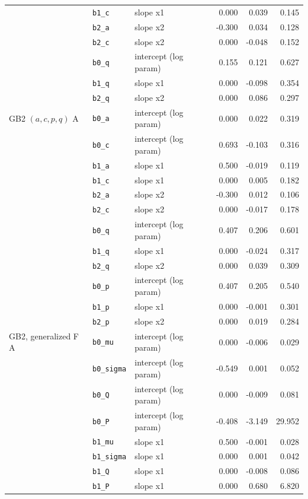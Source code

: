 {\begin{longtable}{lllrrr}
 & \texttt{b1\_c} & slope x1 & 0.000 & 0.039 & 0.145 \\
 & \texttt{b2\_a} & slope x2 & -0.300 & 0.034 & 0.128 \\
 & \texttt{b2\_c} & slope x2 & 0.000 & -0.048 & 0.152 \\
 & \texttt{b0\_q} & intercept (log param) & 0.155 & 0.121 & 0.627 \\
 & \texttt{b1\_q} & slope x1 & 0.000 & -0.098 & 0.354 \\
 & \texttt{b2\_q} & slope x2 & 0.000 & 0.086 & 0.297 \\
GB2 $(a,c,p,q)$ A & \texttt{b0\_a} & intercept (log param) & 0.000 & 0.022 & 0.319 \\
 & \texttt{b0\_c} & intercept (log param) & 0.693 & -0.103 & 0.316 \\
 & \texttt{b1\_a} & slope x1 & 0.500 & -0.019 & 0.119 \\
 & \texttt{b1\_c} & slope x1 & 0.000 & 0.005 & 0.182 \\
 & \texttt{b2\_a} & slope x2 & -0.300 & 0.012 & 0.106 \\
 & \texttt{b2\_c} & slope x2 & 0.000 & -0.017 & 0.178 \\
 & \texttt{b0\_q} & intercept (log param) & 0.407 & 0.206 & 0.601 \\
 & \texttt{b1\_q} & slope x1 & 0.000 & -0.024 & 0.317 \\
 & \texttt{b2\_q} & slope x2 & 0.000 & 0.039 & 0.309 \\
 & \texttt{b0\_p} & intercept (log param) & 0.407 & 0.205 & 0.540 \\
 & \texttt{b1\_p} & slope x1 & 0.000 & -0.001 & 0.301 \\
 & \texttt{b2\_p} & slope x2 & 0.000 & 0.019 & 0.284 \\
GB2, generalized F A & \texttt{b0\_mu} & intercept (log param) & 0.000 & -0.006 & 0.029 \\
 & \texttt{b0\_sigma} & intercept (log param) & -0.549 & 0.001 & 0.052 \\
 & \texttt{b0\_Q} & intercept (log param) & 0.000 & -0.009 & 0.081 \\
 & \texttt{b0\_P} & intercept (log param) & -0.408 & -3.149 & 29.952 \\
 & \texttt{b1\_mu} & slope x1 & 0.500 & -0.001 & 0.028 \\
 & \texttt{b1\_sigma} & slope x1 & 0.000 & 0.001 & 0.042 \\
 & \texttt{b1\_Q} & slope x1 & 0.000 & -0.008 & 0.086 \\
 & \texttt{b1\_P} & slope x1 & 0.000 & 0.680 & 6.820 \\

\end{longtable}}
